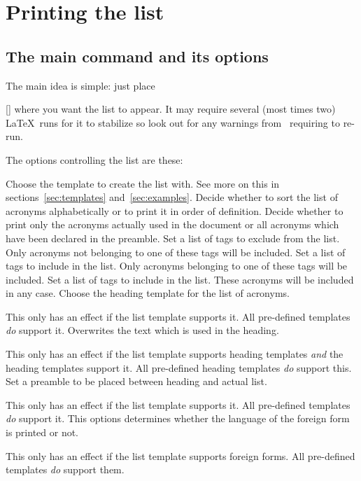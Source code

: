 \documentclass{acro-manual}
\begin{document}
\section{Printing the list}\label{sec:printing-list}
\subsection{The main command and its options}\label{sec:main-list}
The main idea is simple: just place
\begin{commands}
  []
    where you want the list to appear.  It may require several (most times
    two) \LaTeX\ runs for it to stabilize so look out for any warnings
    from \acro\ requiring to re-run.
\end{commands}
The options controlling the list are these:
\begin{options}
    Choose the template to create the list with.  See more on this in
    sections~\vref{sec:templates} and~\vref{sec:examples}.
    Decide whether to sort the list of acronyms alphabetically or to print it
    in order of definition.
    Decide whether to print only the acronyms actually used in the document or
    all acronyms which have been declared in the preamble.
  \Initial
    Set a list of tags to exclude from the list.  Only acronyms not
    belonging to one of these tags will be included.
  \Initial
    Set a list of tags to include in the list.  Only acronyms belonging to
    one of these tags will be included.
  \Initial
    Set a list of tags to include in the list.  These
    acronyms will be included in any case.
    Choose the heading template for the list of acronyms.

    This only has an effect if the list template supports it.  All pre-defined
    templates \emph{do} support it.
    Overwrites the text which is used in the heading.

    This only has an effect if the list template supports heading templates
    \emph{and} the heading templates support it.  All pre-defined heading
    templates \emph{do} support this.
  \Initial
    Set a preamble to be placed between heading and actual list.

    This only has an effect if the list template supports it.  All pre-defined
    templates \emph{do} support it.
    This options determines whether the language of the foreign form is printed
    or not.

    This only has an effect if the list template supports foreign forms.  All
    pre-defined templates \emph{do} support them.
\end{options}
\end{document}
